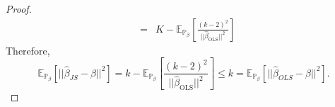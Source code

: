 \documentclass[11pt]{article} %
\begin{document}
\begin{proof}
\begin{eqnarray*}
&=&  K - \mathbb{E}_{\mathbb{P}_{\beta}} \left[ \frac{(k-2)^2}{||\widehat{\beta}_{\textrm{OLS}} ||^2} \right] 
\end{eqnarray*}
Therefore,
\[  \mathbb{E}_{\mathbb{P}_{\beta}} \left[ ||\widehat{\beta}_{JS} -\beta ||^2 \right] = k - \mathbb{E}_{\mathbb{P}_{\beta}} \left[ \frac{(k-2)^2}{||\widehat{\beta}_{\textrm{OLS}} ||^2} \right] \leq k =\mathbb{E}_{\mathbb{P}_{\beta}} \left[ ||\widehat{\beta}_{OLS} -\beta ||^2 \right].    \]
\end{proof}

\newpage




\end{document}
